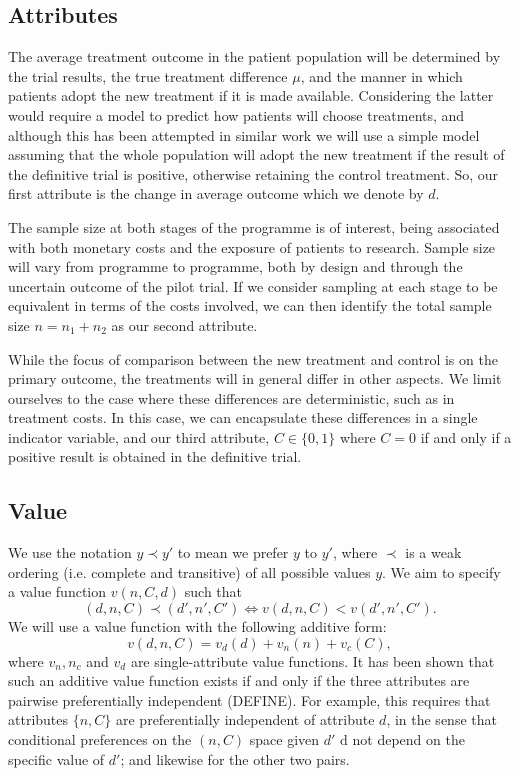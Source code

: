 \documentclass[sagev, Crown]{sagej}
\begin{document}
\subsection{Attributes}

The average treatment outcome in the patient population will be determined by the trial results, the true treatment difference $\mu$, and the manner in which patients adopt the new treatment if it is made available. Considering the latter would require a model to predict how patients will choose treatments, and although this has been attempted in similar work \cite{Gittins2000a, Kikuchi2009} we will use a simple model assuming that the whole population will adopt the new treatment if the result of the definitive trial is positive, otherwise retaining the control treatment. So, our first attribute is the change in average outcome which we denote by $d$.

The sample size at both stages of the programme is of interest, being associated with both monetary costs and the exposure of patients to research. Sample size will vary from programme to programme, both by design and through the uncertain outcome of the pilot trial. If we consider sampling at each stage to be equivalent in terms of the costs involved, we can then identify the total sample size $n = n_1 + n_2$ as our second attribute. 

While the focus of comparison between the new treatment and control is on the primary outcome, the treatments will in general differ in other aspects. We limit ourselves to the case where these differences are deterministic, such as in treatment costs. In this case, we can encapsulate these differences in a single indicator variable, and our third attribute,  $C \in \{0, 1\}$ where $C = 0$ if and only if a positive result is obtained in the definitive trial. 

\subsection{Value}

We use the notation $y \prec y'$ to mean we prefer $y$ to $y'$, where $\prec$ is a weak ordering (i.e. complete and transitive) of all possible values $y$. We aim to specify a value function $v(n, C, d)$ such that
$$
(d, n, C) \prec (d', n', C') \Leftrightarrow v(d, n, C) < v(d', n', C').
$$
We will use a value function with the following additive form:
$$ 
v(d, n, C) =  v_d(d) + v_n(n) + v_c(C),
$$
where $v_n, n_c$ and $v_d$ are single-attribute value functions. It has been shown that such an additive value function exists if and only if the three attributes are pairwise preferentially independent (DEFINE). For example, this requires that attributes $\{n, C\}$ are preferentially independent of attribute $d$, in the sense that conditional preferences on the $(n, C)$ space given $d'$ d not depend on the specific value of $d'$; and likewise for the other two pairs.
\end{document}
